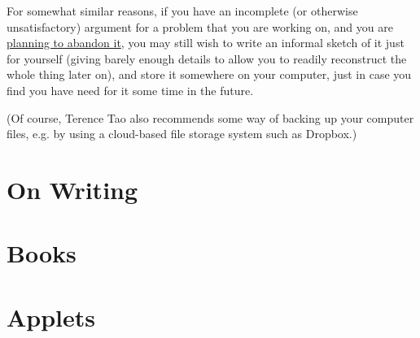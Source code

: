 \documentclass{book}
\numberwithin{equation}{section}
\begin{document}
%
For somewhat similar reasons, if you have an incomplete (or otherwise unsatisfactory) argument for a problem that you are working on, and you are \href{https://terrytao.wordpress.com/career-advice/use-the-wastebasket/}{planning to abandon it}, you may still wish to write an informal sketch of it just for yourself (giving barely enough details to allow you to readily reconstruct the whole thing later on), and store it somewhere on your computer, just in case you find you have need for it some time in the future.

(Of course, Terence Tao also recommends some way of backing up your computer files, e.g. by using a cloud-based file storage system such as Dropbox.)


\chapter{On Writing}


\chapter{Books}


\chapter{Applets}


\printbibliography[heading=bibintoc]
\end{document}
